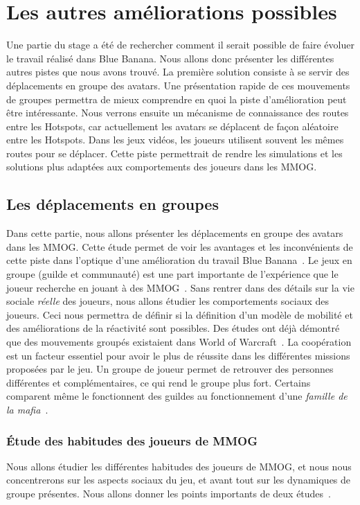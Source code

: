 \newpage
\section{Les autres améliorations possibles}

Une partie du stage a été de rechercher comment il serait possible de faire évoluer le travail réalisé dans Blue Banana. Nous allons donc présenter les différentes autres pistes que nous avons trouvé. La première solution consiste à se servir des déplacements en groupe des avatars. Une présentation rapide de ces mouvements de groupes permettra de mieux comprendre en quoi la piste d'amélioration peut être intéressante. Nous verrons ensuite un mécanisme de connaissance des routes entre les Hotspots, car actuellement les avatars se déplacent de façon aléatoire entre les Hotspots. Dans les jeux vidéos, les joueurs utilisent souvent les mêmes routes pour se déplacer. Cette piste permettrait de rendre les simulations et les solutions plus adaptées aux comportements des joueurs dans les MMOG.

\subsection{Les déplacements en groupes}

Dans cette partie, nous allons présenter les déplacements en groupe des avatars dans les MMOG. Cette étude permet de voir les avantages et les inconvénients de cette piste dans l'optique d'une amélioration du travail Blue Banana~\cite{191}. Le jeux en groupe (guilde et communauté) est une part importante de l'expérience que le joueur recherche en jouant à des MMOG~\cite{1501834,1255052}. Sans rentrer dans des détails sur la vie sociale \textit{réelle} des joueurs, nous allons étudier les comportements sociaux des joueurs. Ceci nous permettra de définir si la définition d'un modèle de mobilité et des améliorations de la réactivité sont possibles. Des études ont déjà démontré que des mouvements groupés existaient dans World of Warcraft~\cite{15141312}. La coopération est un facteur essentiel pour avoir le plus de réussite  dans les différentes missions proposées par le jeu. Un groupe de joueur permet de retrouver des personnes différentes et complémentaires, ce qui rend le groupe plus fort. Certains comparent même le fonctionnent des guildes au fonctionnement d'une \textit{famille de la mafia}~\cite{Jakobsson03thesopranos}.


\subsubsection{Étude des habitudes des joueurs de MMOG}
Nous allons étudier les différentes habitudes des joueurs de MMOG, et nous nous concentrerons sur les aspects sociaux du jeu, et avant tout sur les dynamiques de groupe présentes. Nous allons donner les points importants de deux études~\cite{1255052,StudyEQ}.


